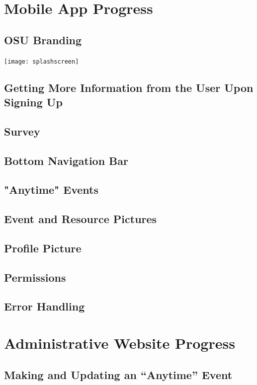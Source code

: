 \documentclass[onecolumn, draftclsnofoot,10pt, compsoc]{IEEEtran}
\begin{document}
\section{Mobile App Progress}
  \subsection{OSU Branding}
    \texttt{[image: splashscreen]}

  \subsection{Getting More Information from the User Upon Signing Up}

  \subsection{Survey}

  \subsection{Bottom Navigation Bar}

  \subsection{"Anytime" Events}

  \subsection{Event and Resource Pictures}

  \subsection{Profile Picture}

  \subsection{Permissions}

  \subsection{Error Handling}

\section{Administrative Website Progress}
  \subsection{Making and Updating an “Anytime” Event}
\end{document}
